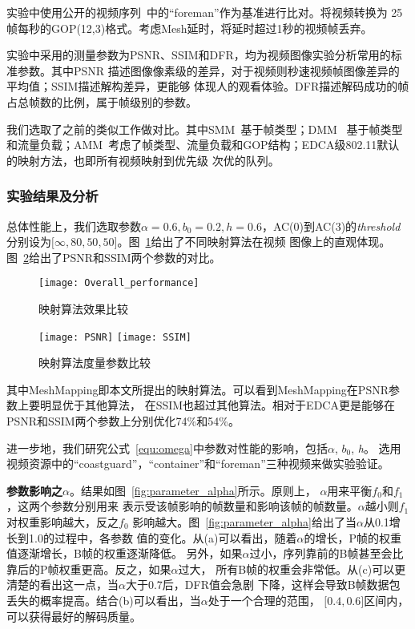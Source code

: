 实验中使用公开的视频序列~\cite{videos}中的“foreman”作为基准进行比对。将视频转换为
25帧每秒的GOP(12,3)格式。考虑Mesh延时，将延时超过1秒的视频帧丢弃。

实验中采用的测量参数为PSNR、SSIM和DFR，均为视频图像实验分析常用的标准参数。其中PSNR
描述图像像素级的差异，对于视频则秒速视频帧图像差异的平均值；SSIM描述解构差异，更能够
体现人的观看体验。DFR描述解码成功的帧占总帧数的比例，属于帧级别的参数。

我们选取了之前的类似工作做对比。其中SMM~\cite{SMM}基于帧类型；DMM~\cite{DMM}
基于帧类型和流量负载；AMM~\cite{AMM}考虑了帧类型、流量负载和GOP结构；EDCA级802.11默认的映射方法，也即所有视频映射到优先级
次优的队列。

\subsubsection{实验结果及分析}
总体性能上，我们选取参数$\alpha=0.6, b_{0}=0.2, h=0.6$，AC(0)到AC(3)的\emph{threshold}
分别设为$\lbrack\infty, 80, 50, 50\rbrack$。图~\ref{fig:overall_performance}给出了不同映射算法在视频
图像上的直观体现。图~\ref{fig:parameters}给出了PSNR和SSIM两个参数的对比。

\begin{figure}[H] %
  \centering
  \texttt{[image: Overall\_performance]}
  \caption{映射算法效果比较}
  \label{fig:overall_performance}
\end{figure}

\begin{figure}[h]
  \centering
  \subcaptionbox{}
      {\texttt{[image: PSNR]}}
  \hspace{1em}
  \subcaptionbox{}
    {\texttt{[image: SSIM]}}
  \caption{映射算法度量参数比较}
  \label{fig:parameters}
\end{figure}

其中MeshMapping即本文所提出的映射算法。可以看到MeshMapping在PSNR参数上要明显优于其他算法，
在SSIM也超过其他算法。相对于EDCA更是能够在PSNR和SSIM两个参数上分别优化74\%和54\%。

进一步地，我们研究公式~\ref{equ:omega}中参数对性能的影响，包括$\alpha$, $b_{0}$, \emph{h}。
选用视频资源中的“coastguard”，“container”和“foreman”三种视频来做实验验证。

\textbf{参数影响之$\alpha$}。结果如图~\ref{fig:parameter_alpha}所示。原则上，
$\alpha$用来平衡$f_{0}$和$f_{1}$，这两个参数分别用来
表示受该帧影响的帧数量和影响该帧的帧数量。$\alpha$越小则$f_{1}$对权重影响越大，反之$f_{0}$
影响越大。图~\ref{fig:parameter_alpha}给出了当$\alpha$从0.1增长到1.0的过程中，各参数
值的变化。从(a)可以看出，随着$\alpha$的增长，P帧的权重值逐渐增长，B帧的权重逐渐降低。
另外，如果$\alpha$过小，序列靠前的B帧甚至会比靠后的P帧权重更高。反之，如果$\alpha$过大，
所有B帧的权重会非常低。从(c)可以更清楚的看出这一点，当$\alpha$大于0.7后，DFR值会急剧
下降，这样会导致B帧数据包丢失的概率提高。结合(b)可以看出，当$\alpha$处于一个合理的范围，
$\lbrack0.4,0.6\rbrack$区间内，可以获得最好的解码质量。


